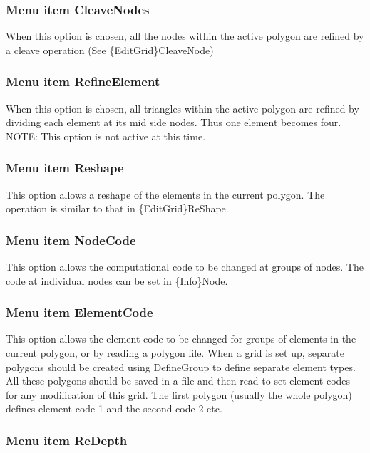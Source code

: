 \documentclass{article}
\begin{document}
\subsubsection[Menu item CleaveNodes]{Menu item CleaveNodes}
When this option is chosen, all the nodes within the active polygon are refined by a cleave operation (See \{EditGrid\}CleaveNode)

\subsubsection[Menu item RefineElement]{Menu item RefineElement}
When this option is chosen, all triangles within the active polygon are refined by dividing each element at its mid side nodes. Thus one element becomes four. NOTE: This option is not active at this time.

\subsubsection[Menu item Reshape]{Menu item Reshape}
This option allows a reshape of the elements in the current polygon. The operation is similar to that in \{EditGrid\}ReShape.

\subsubsection[Menu item NodeCode]{Menu item NodeCode}
This option allows the computational code to be changed at groups of nodes. The code at individual nodes can be set in \{Info\}Node.

\subsubsection[Menu item ElementCode]{Menu item ElementCode}
This option allows the element code to be changed for groups of elements in the current polygon, or by reading a polygon file. When a grid is set up, separate polygons should be created using DefineGroup to define separate element types. All these polygons should be saved in a file and then read to set element codes for any modification of this grid. The first polygon (usually the whole polygon) defines element code 1 and the second code 2 etc.

\subsubsection[Menu item ReDepth]{Menu item ReDepth}

\bigskip
\end{document}
